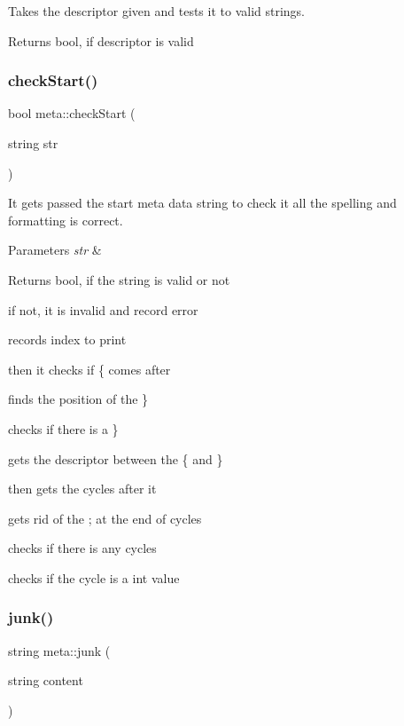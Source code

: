 Takes the descriptor given and tests it to valid strings. 

\begin{DoxyReturn}{Returns}
bool, if descriptor is valid 
\end{DoxyReturn}
\mbox{\label{classmeta_aba0981f2594f4237707bd3c8b39eb132}} 
\subsubsection{\texorpdfstring{checkStart()}{checkStart()}}
{\footnotesize\ttfamily bool meta\+::check\+Start (\begin{DoxyParamCaption}\item[{string}]{str }\end{DoxyParamCaption})}



It gets passed the start meta data string to check it all the spelling and formatting is correct. 


\begin{DoxyParams}{Parameters}
{\em str} & \\
\hline
\end{DoxyParams}
\begin{DoxyReturn}{Returns}
bool, if the string is valid or not 
\end{DoxyReturn}
if not, it is invalid and record error

records index to print

then it checks if \textquotesingle{}\{\textquotesingle{} comes after

finds the position of the \textquotesingle{}\}\textquotesingle{}

checks if there is a \textquotesingle{}\}\textquotesingle{}

gets the descriptor between the \textquotesingle{}\{\textquotesingle{} and \textquotesingle{}\}\textquotesingle{}

then gets the cycles after it

gets rid of the ; at the end of cycles

checks if there is any cycles

checks if the cycle is a int value \mbox{\label{classmeta_a5cf6aca232b3f8cfb979e385803167cd}} 
\subsubsection{\texorpdfstring{junk()}{junk()}}
{\footnotesize\ttfamily string meta\+::junk (\begin{DoxyParamCaption}\item[{string}]{content }\end{DoxyParamCaption})}



